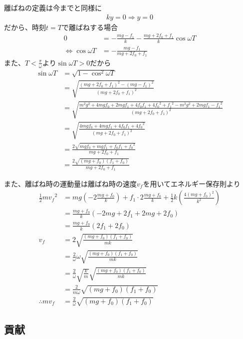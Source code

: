 \documentclass[a4paper,11pt]{jsarticle}
\begin{document}
離ばねの定義は今までと同様に
\begin{align}
  ky=0 \Rightarrow y=0
\end{align}
だから、時刻$t=T$で離ばねする場合
\begin{align}
  0 & = -\frac{mg - f_1}{k} - \frac{mg + 2f_0 + f_1}{k} \cos \omega T
  \\
  \Leftrightarrow
  \cos \omega T
    & = -\frac{mg - f_1}{mg + 2f_0 + f_1}
\end{align}
また、$T<\frac{\pi}{\omega}$より$\sin \omega T > 0$だから
\begin{align}
  \sin \omega T
   & = \sqrt{1 - \cos^2 \omega T}
  \\
   & = \sqrt{ \frac{(mg + 2f_0 + f_1)^2 - (mg - f_1)^2}{(mg + 2f_0 + f_1)^2}}
  \\
   & = \sqrt{
  \frac{m^2g^2 + 4mgf_0 + 2mgf_1 + 4f_0f_1 + 4{f_0}^2 + {f_1}^2 - m^2g^2 + 2mgf_1 - {f_1}^2}
  {(mg + 2f_0 + f_1)^2}
  }
  \\
   & = \sqrt{
    \frac{4mgf_0 + 4mgf_1 + 4f_0f_1 + 4{f_0}^2}{(mg + 2f_0 + f_1)^2}
  }
  \\
   & = \frac{2\sqrt{mgf_0 + mgf_1 + f_0f_1 + {f_0}^2}}{mg + 2f_0 + f_1}
  \\
   & = \frac{2\sqrt{(mg + f_0)(f_1+f_0)}}{mg + 2f_0 + f_1}
\end{align}

また、離ばね時の運動量は離ばね時の速度$v_f$を用いてエネルギー保存則より
\begin{align}
  \frac{1}{2}m{v_f}^2
   & = mg\left(-2\frac{mg+f_0}{k}\right)
  + f_1\cdot 2\frac{mg+f_0}{k} + \frac{1}{2}k\left( \frac{4(mg+f_0)^2}{k^2} \right)
  \\
   & = \frac{mg+f_0}{k}\left( -2mg + 2f_1 + 2mg + 2f_0 \right)
  \\
   & = \frac{mg+f_0}{k}\left( 2f_1 + 2f_0 \right)
  \\
  v_f
   & = 2\sqrt{\frac{(mg + f_0) (f_1 + f_0)}{mk}}
  \\
   & = \frac{2}{\omega}\omega \sqrt{\frac{(mg + f_0) (f_1 + f_0)}{mk}}
  \\
   & = \frac{2}{\omega} \sqrt{\frac{k}{m}} \sqrt{\frac{(mg + f_0) (f_1 + f_0)}{mk}}
  \\
   & = \frac{2}{m\omega}\sqrt{(mg + f_0)(f_1 + f_0)}
  \\ \therefore
  mv_f
   & = \frac{2}{\omega} \sqrt{(mg + f_0)(f_1 + f_0)}
\end{align}

\subsection{貢献}
\end{document}
